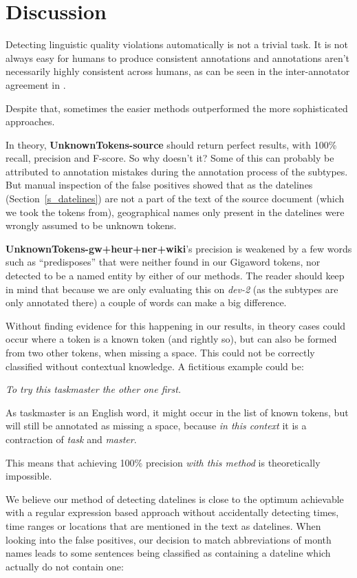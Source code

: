 \documentclass[a4paper,10pt]{scrartcl}
\theoremstyle{style}
\begin{document}
\newpage
\section{Discussion}
\label{discussion}
Detecting linguistic quality violations automatically is not a trivial task. It is not always easy for humans to produce consistent annotations and annotations aren't necessarily highly consistent across humans, as can be seen in the inter-annotator agreement in \cite{friedrichlqvsumm}.

Despite that, sometimes the easier methods outperformed the more sophisticated approaches.

In theory, \textbf{UnknownTokens-source} should return perfect results, with 100\% recall, precision and F-score. So why doesn't it? Some of this can probably be attributed to annotation mistakes during the annotation process of the subtypes. But manual inspection of the false positives showed that as the datelines (Section~\ref{s_datelines}) are not a part of the text of the source document (which we took the tokens from), geographical names only present in the datelines were wrongly assumed to be unknown tokens.

\textbf{UnknownTokens-gw+heur+ner+wiki}'s precision is weakened by a few words such as ``predisposes'' that were neither found in our Gigaword tokens, nor detected to be a named entity by either of our methods. The reader should keep in mind that because we are only evaluating this on \textit{dev-2} (as the subtypes are only annotated there) a couple of words can make a big difference.

Without finding evidence for this happening in our results, in theory cases could occur where a token is a known token (and rightly so), but can also be formed from two other tokens, when missing a space. This could not be correctly classified without contextual knowledge. A fictitious example could be:

\quad\textit{To try this taskmaster the other one first.}

As taskmaster is an English word, it might occur in the list of known tokens, but will still be annotated as missing a space, because \textit{in this context} it is a contraction of \textit{task} and \textit{master}.

This means that achieving 100\% precision \textit{with this method} is theoretically impossible.

We believe our method of detecting datelines is close to the optimum achievable with a regular expression based approach without accidentally detecting times, time ranges or locations that are mentioned in the text as datelines.
When looking into the false positives, our decision to match abbreviations of month names leads to some sentences being classified as containing a dateline which actually do not contain one:
\end{document}
